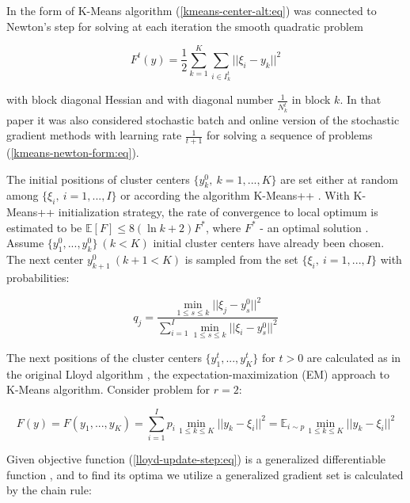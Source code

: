 In \cite{Bottou_1994} the form of K-Means algorithm (\ref{kmeans-center-alt:eq}) was connected to Newton's step for solving at each iteration the smooth quadratic problem

\begin{equation}
    \label{kmeans-newton-form:eq}
        F^t(y) = \frac{1}{2} \sum_{k=1}^K \sum_{i \in I_k^t} || \xi_i - y_k ||^2
\end{equation}

\noindent with block diagonal Hessian and with diagonal number $ \frac{1}{N_k^t} $ in block $ k $. In that paper it was also considered stochastic batch and online version of the stochastic gradient methods with learning rate $ \frac{1}{t + 1} $ for solving a sequence of problems (\ref{kmeans-newton-form:eq}).

The initial positions of cluster centers $ \{ y_k^0, \> k = 1, ..., K \} $ are set either at random among $ \{ \xi_i, \> i = 1, ..., I \} $ or according the algorithm K-Means++ \cite{Arthur_Vassilvitskii_2007,Nguyen_Duong_2018}. With K-Means++ initialization strategy, the rate of convergence to local optimum is estimated to be $ \mathbb{E} [F] \leq 8(\ln k + 2 ) F^{*} $, where $ F^{*} $ - an optimal solution \cite{Arthur_Vassilvitskii_2007}. Assume $ \{ y_1^0, ..., y_k^0 \} \> (k<K) $ initial cluster centers have already been chosen. The next center $ y_{k+1}^0 \> (k+1<K) $ is sampled from the set $ \{ \xi_i, \> i = 1, ..., I \} $ with probabilities:

\begin{equation}
    \label{kmeans-plus-plus-init:eq}
        q_j = \frac{\min_{1 \leq s \leq k} || \xi_j - y_s^0 ||^2}{\sum_{i=1}^I \min_{1 \leq s \leq k} || \xi_i - y_s^0 ||^2}
\end{equation}

The next positions of the cluster centers $ \{ y_1^t, ..., y_K^t \} $ for $ t > 0 $ are calculated as in the original Lloyd algorithm \cite{Lloyd_1982}, the expectation-maximization (EM) approach to K-Means algorithm. Consider problem for $ r = 2 $: 

\begin{equation}
    \label{lloyd-update-step:eq}
        F(y) = F(y_1, ..., y_K) = \sum_{i=1}^I p_i \min_{1 \leq k \leq K} || y_k - \xi_i ||^2 = \mathbb{E}_{i \sim p} \min_{1 \leq k \leq K} || y_k - \xi_i ||^2
\end{equation}

Given objective function (\ref{lloyd-update-step:eq}) is a generalized differentiable function \cite{Norkin_1986}, and to find its optima we utilize a generalized gradient set is calculated by the chain rule:

